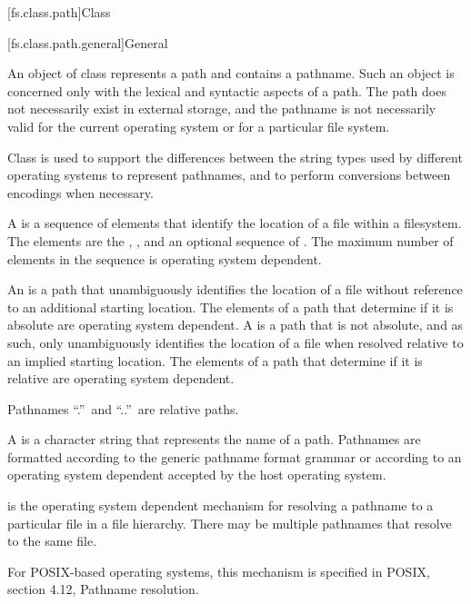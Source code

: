 [fs.class.path]{Class }

[fs.class.path.general]{General}

%
\pnum
An object of class  represents a path
and contains a pathname.
Such an object is concerned only with the lexical and syntactic aspects
of a path. The path does not necessarily exist in external storage, and the
pathname is not necessarily valid for the current operating
system or for a particular file system.

\pnum
\begin{note}
Class  is used to support the differences between the string types used by different operating systems to represent pathnames, and to perform conversions between encodings when necessary.
\end{note}

\pnum
A  is
a sequence of elements that identify
the location of a file within a filesystem.
The elements are the
,
,
and an optional sequence of .
The maximum number of elements in the sequence is
operating system dependent.

\pnum
An  is a path that unambiguously
identifies the location of a file without reference to an additional starting
location. The elements of a path that determine if it is absolute are
operating system dependent.
A  is
a path that is not absolute, and as such, only unambiguously
identifies the location of a file when resolved relative to
an implied starting location. The elements of a path that determine if it is
relative are operating system dependent.
\begin{note}
Pathnames ``.''\ and ``..''\ are relative paths.
\end{note}

\pnum
A  is
a character string that represents the name of a path. Pathnames are
formatted according to the generic pathname format grammar
or according to an
operating system dependent
 accepted by the host operating system.

\pnum
{}
is the operating system dependent mechanism for resolving
a pathname to a particular file in a file hierarchy. There may be multiple
pathnames that resolve to the same file.
\begin{example}
For POSIX-based operating systems,
this mechanism is specified in POSIX, section 4.12, Pathname resolution.
\end{example}

